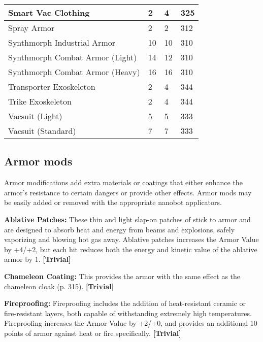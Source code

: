 \begin{table}
\begin{tabular}{|l|l|l|l|}
Smart Vac Clothing	&2	&4	&325	\\ \hline

Spray Armor	&2	&2	&312	\\ \hline

Synthmorph Industrial Armor	&10	&10	&310	\\ \hline

Synthmorph Combat Armor (Light)	&14	&12	&310	\\ \hline

Synthmorph Combat Armor (Heavy)	&16	&16	&310	\\ \hline

Transporter Exoskeleton	&2	&4	&344	\\ \hline

Trike Exoskeleton	&2	&4	&344	\\ \hline

Vacsuit (Light)	&5	&5	&333	\\ \hline

Vacsuit (Standard)	&7	&7	&333	\\ \hline

\end{tabular} \label{tab:armor-values} \end{table} 



\subsection{Armor mods} \label{sec:armor-mods} 

Armor modifications add extra materials or coatings that either enhance the armor’s resistance to certain dangers or provide other effects. Armor mods may be easily added or removed with the appropriate nanobot applicators. 

\textbf{Ablative Patches:} These thin and light slap-on patches of stick to armor and are designed to absorb heat and energy from beams and explosions, safely vaporizing and blowing hot gas away. Ablative patches increases the Armor Value by +4/+2, but each hit reduces both the energy and kinetic value of the ablative armor by 1. \textbf{[Trivial]} 

\textbf{Chameleon Coating:} This provides the armor with the same effect as the chameleon cloak (p. 315). \textbf{[Trivial]} 

\textbf{Fireproofing:} Fireproofing includes the addition of heat-resistant ceramic or fire-resistant layers, both capable of withstanding extremely high temperatures. Fireproofing increases the Armor Value by +2/+0, and provides an additional 10 points of armor against heat or fire specifically. \textbf{[Trivial]} 

